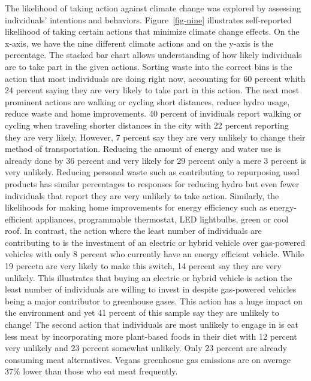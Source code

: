 \documentclass[
  letterpaper,
  DIV=11,
  numbers=noendperiod]{scrartcl}
\begin{document}
The likelihood of taking action against climate change was explored by
assessing individuals' intentions and behaviors. Figure~\ref{fig-nine}
illustrates self-reported likelihood of taking certain actions that
minimize climate change effects. On the x-axis, we have the nine
different climate actions and on the y-axis is the percentage. The
stacked bar chart allows understanding of how likely individuals are to
take part in the given actions. Sorting waste into the correct bins is
the action that most individuals are doing right now, accounting for 60
percent whith 24 percent saying they are very likely to take part in
this action. The next most prominent actions are walking or cycling
short distances, reduce hydro usage, reduce waste and home improvements.
40 percent of invidiuals report walking or cycling when traveling
shorter distances in the city with 22 percent reporting they are very
likely. However, 7 percent say they are very unlikely to change their
method of transportation. Reducing the amount of energy and water use is
already done by 36 percent and very likely for 29 percent only a mere 3
percent is very unlikely. Reducing personal waste such as contributing
to repurposing used products has similar percentages to responses for
reducing hydro but even fewer individuals that report they are very
unlikely to take action. Similarly, the likelihoods for making home
improvements for energy efficiency such as energy-efficient appliances,
programmable thermostat, LED lightbulbs, green or cool roof. In
contrast, the action where the least number of individuals are
contributing to is the investment of an electric or hybrid vehicle over
gas-powered vehicles with only 8 percent who currently have an energy
efficient vehicle. While 19 percetn are very likely to make this switch,
14 percent say they are very unlikely. This illustrates that buying an
electric or hybrid vehicle is action the least number of individuals are
willing to invest in despite gas-powered vehicles being a major
contributor to greenhouse gases. This action has a huge impact on the
environment and yet 41 percent of this sample say they are unlikely to
change! The second action that individuals are most unlikely to engage
in is eat less meat by incorporating more plant-based foods in their
diet with 12 percent very unlikely and 23 percent somewhat unlikely.
Only 23 percent are already consuming meat alternatives. Vegans
greenhosue gas emissions are on average 37\% lower than those who eat
meat frequently.
\end{document}
